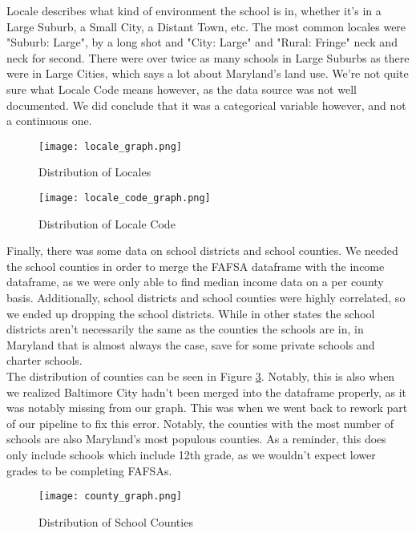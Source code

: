 \documentclass[12pt]{article}
\begin{document}
Locale describes what kind of environment the school is in, whether it's in a Large Suburb,
a Small City, a Distant Town, etc. The most common locales were "Suburb: Large", by a long shot
and "City: Large" and "Rural: Fringe" neck and neck for second. There were over twice as many
schools in Large Suburbs as there were in Large Cities, which says a lot about Maryland's land
use. We're not quite sure what Locale Code means however, as the data source was not well
documented. We did conclude that it was a categorical variable however, and not a continuous 
one.\\

\begin{figure}[!htb]
  \centering
  \texttt{[image: locale\_graph.png]}
  \caption{Distribution of Locales}
  \label{fig:locale}
\end{figure}

\begin{figure}[!htb]
  \centering
  \texttt{[image: locale\_code\_graph.png]}
  \caption{Distribution of Locale Code}
  \label{fig:locale_code}
\end{figure}

Finally, there was some data on school districts and school counties. We needed the
school counties in order to merge the FAFSA dataframe with the income dataframe, as
we were only able to find median income data on a per county basis. Additionally,
school districts and school counties were highly correlated, so we ended up dropping
the school districts. While in other states the school districts aren't necessarily
the same as the counties the schools are in, in Maryland that is almost always the
case, save for some private schools and charter schools.\\

The distribution of counties can be seen in Figure \ref{fig:county}. Notably, this is
also when we realized Baltimore City hadn't been merged into the dataframe properly,
as it was notably missing from our graph. This was when we went back to rework part
of our pipeline to fix this error. Notably, the counties with the most number of 
schools are also Maryland's most populous counties. As a reminder, this does only
include schools which include 12th grade, as we wouldn't expect lower grades to
be completing FAFSAs.\\

\begin{figure}[!htb]
  \centering
  \texttt{[image: county\_graph.png]}
  \caption{Distribution of School Counties}
  \label{fig:county}
\end{figure}
\end{document}
